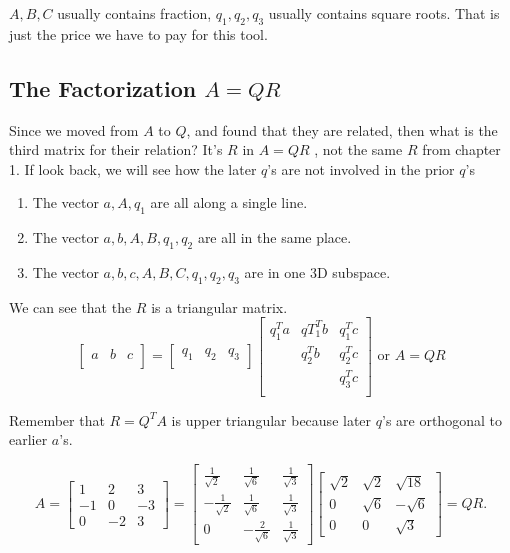 \(A, B, C\) usually contains fraction, \(q_1, q_2, q_3\) usually contains square roots. That is just the price we have to pay for this tool. 

\subsection{The Factorization \(A = QR\) }


Since we moved from \(A\) to \(Q\), and found that they are related, then what is the third matrix for their relation? It's \(R\) in \(A = QR\) , not the same \(R\) from chapter 1. If look back, we will see how the later \(q\)'s are not involved in the prior \(q\)'s
\begin{enumerate}
    \item The vector \(a, A, q_1\) are all along a single line. 
    \item The vector \(a, b, A, B, q_1, q_2\) are all in the same place. 
    \item The vector \(a, b, c, A, B, C, q_1, q_2, q_3\) are in one 3D subspace.  
\end{enumerate}       

We can see that the \(R\) is a triangular matrix. 
\[
    \begin{bmatrix}
        a & b & c  \\
    \end{bmatrix}
    = 
    \begin{bmatrix}
        q_1 & q_2 & q_3  \\
    \end{bmatrix}
    \begin{bmatrix}
        q^T_1 a & qT^T_1 b & q^T_1 c  \\
         & q^T_2 b & q^T_2 c  \\
         &  & q^T_3 c  \\
    \end{bmatrix}
    \text{ or }
    A = QR
\]

Remember that \(R = Q^T A\) is upper triangular because later \(q\)'s are orthogonal to earlier \(a\)'s. 

\[
A = \begin{bmatrix}
1 & 2 & 3 \\
-1 & 0 & -3 \\
0 & -2 & 3
\end{bmatrix}
=
\begin{bmatrix}
\frac{1}{\sqrt{2}} & \frac{1}{\sqrt{6}} & \frac{1}{\sqrt{3}} \\
-\frac{1}{\sqrt{2}} & \frac{1}{\sqrt{6}} & \frac{1}{\sqrt{3}} \\
0 & -\frac{2}{\sqrt{6}} & \frac{1}{\sqrt{3}}
\end{bmatrix}
\begin{bmatrix}
\sqrt{2} & \sqrt{2} & \sqrt{18} \\
0 & \sqrt{6} & -\sqrt{6} \\
0 & 0 & \sqrt{3}
\end{bmatrix}
= QR.
\]

